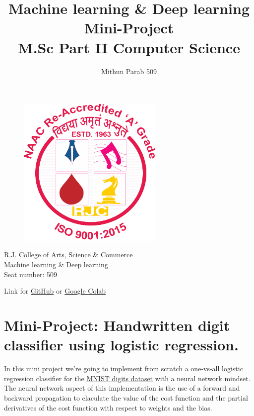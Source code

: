 \documentclass[11pt]{article}
\title{\huge{\textbf{ Machine learning \& Deep learning Mini-Project}} \\
    \LARGE{M.Sc Part II Computer Science}}
\author{Mithun Parab 509}
\begin{document}
    
\clearpage\maketitle
\thispagestyle{empty}
\begin{center}
    \begin{figure}[h]
        \centering
        \includegraphics[width=7cm]{RJCLG.png}
        \label{fig:logo}
    \end{figure}

    \large{R.J. College of Arts, Science \& Commerce \\
    Machine learning \& Deep learning\\
    Seat number: 509
    }
\end{center}
% 
\newpage
\tableofcontents
\begin{center}
    Link for \href{https://github.com/Mithunprb/MSc-Practicals-Journals/tree/main/MSc-Part2/MLDL/Mini-Project}{GitHub} or \href{https://colab.research.google.com/drive/1GkOTH8IbZbztvEqZ_rMvUi1EwhCzNjZ_?usp=sharing}{ Google Colab}
\end{center}
\newpage
{} %
    

    
    \hypertarget{mini-project-handwritten-digit-classifier-using-logistic-regression.}{%
\section{Mini-Project: Handwritten digit classifier using logistic
regression.}\label{mini-project-handwritten-digit-classifier-using-logistic-regression.}}

In this mini project we're going to implement from scratch a one-vs-all
logistic regression classifier for the
\href{https://drive.google.com/file/d/1lyP8UkVxEFm6cAhjYXwRUP3k3n0ddTgD/view?usp=sharing}{MNIST
digits dataset} with a neural network mindset. The neural network aspect
of this implementation is the use of a forward and backward propagation
to claculate the value of the cost function and the partial derivatives
of the cost function with respect to weights and the bias.
\end{document}
